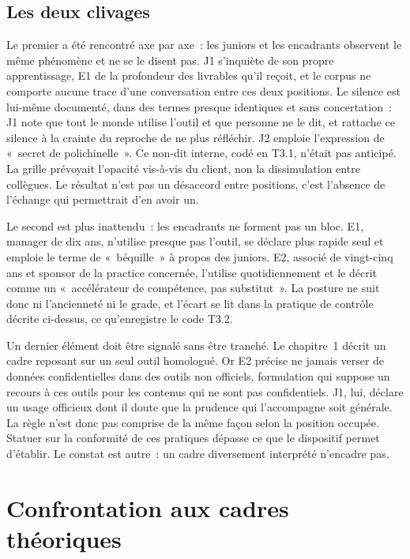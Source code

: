 \subsection{Les deux clivages}

Le premier a été rencontré axe par axe~: les juniors et les encadrants observent le même
phénomène et ne se le disent pas. J1 s'inquiète de son propre apprentissage, E1 de la
profondeur des livrables qu'il reçoit, et le corpus ne comporte aucune trace d'une
conversation entre ces deux positions. Le silence est lui-même documenté, dans des termes
presque identiques et sans concertation~: J1 note que tout le monde utilise l'outil et que
personne ne le dit, et rattache ce silence à la crainte du reproche de ne plus réfléchir. J2
emploie l'expression de «~secret de polichinelle~». Ce non-dit interne, codé en T3.1, n'était
pas anticipé. La grille prévoyait l'opacité vis-à-vis du client, non la dissimulation
entre collègues. Le résultat n'est pas un désaccord entre positions, c'est l'absence de
l'échange qui permettrait d'en avoir un.

Le second est plus inattendu~: les encadrants ne forment pas un bloc. E1, manager de dix ans,
n'utilise presque pas l'outil, se déclare plus rapide seul et emploie le terme de «~béquille~»
à propos des juniors. E2, associé de vingt-cinq ans et sponsor de la practice
concernée, l'utilise quotidiennement et le décrit comme un «~accélérateur de compétence, pas
substitut~». La posture ne suit donc ni l'ancienneté ni le grade, et l'écart se lit dans la
pratique de contrôle décrite ci-dessus, ce qu'enregistre le code T3.2.

Un dernier élément doit être signalé sans être tranché. Le chapitre~1 décrit un cadre
reposant sur un seul outil homologué. Or E2 précise ne jamais verser de données
confidentielles dans des outils non officiels, formulation qui suppose un recours à ces outils
pour les contenus qui ne sont pas confidentiels. J1, lui, déclare un usage officieux dont il doute que
la prudence qui l'accompagne soit générale. La règle n'est donc pas comprise de la même façon
selon la position occupée. Statuer sur la conformité de ces pratiques dépasse ce que le
dispositif permet d'établir. Le constat est autre~: un cadre diversement interprété
n'encadre pas.

\section{Confrontation aux cadres théoriques}


